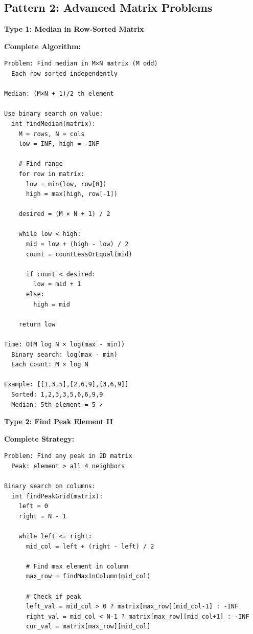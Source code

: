 \documentclass[11pt,a4paper,oneside]{book}
\begin{document}
\subsection{Pattern 2: Advanced Matrix Problems}

\begin{tcolorbox}[
    enhanced,breakable,
    colback=lightgray,
    colframe=accentorange,
    boxrule=2pt,
    arc=4mm,
    title=\textbf{Complete Advanced Patterns}
]
\textbf{Type 1: Median in Row-Sorted Matrix}

\textbf{Complete Algorithm:}
\begin{verbatim}
Problem: Find median in M×N matrix (M odd)
  Each row sorted independently

Median: (M×N + 1)/2 th element

Use binary search on value:
  int findMedian(matrix):
    M = rows, N = cols
    low = INF, high = -INF
    
    # Find range
    for row in matrix:
      low = min(low, row[0])
      high = max(high, row[-1])
    
    desired = (M × N + 1) / 2
    
    while low < high:
      mid = low + (high - low) / 2
      count = countLessOrEqual(mid)
      
      if count < desired:
        low = mid + 1
      else:
        high = mid
    
    return low

Time: O(M log N × log(max - min))
  Binary search: log(max - min)  
  Each count: M × log N

Example: [[1,3,5],[2,6,9],[3,6,9]]
  Sorted: 1,2,3,3,5,6,6,9,9
  Median: 5th element = 5 ✓
\end{verbatim}

\textbf{Type 2: Find Peak Element II}

\textbf{Complete Strategy:}
\begin{verbatim}
Problem: Find any peak in 2D matrix
  Peak: element > all 4 neighbors

Binary search on columns:
  int findPeakGrid(matrix):
    left = 0
    right = N - 1
    
    while left <= right:
      mid_col = left + (right - left) / 2
      
      # Find max element in column
      max_row = findMaxInColumn(mid_col)
      
      # Check if peak
      left_val = mid_col > 0 ? matrix[max_row][mid_col-1] : -INF
      right_val = mid_col < N-1 ? matrix[max_row][mid_col+1] : -INF
      cur_val = matrix[max_row][mid_col]
      

\end{verbatim}
\end{tcolorbox}
\end{document}
